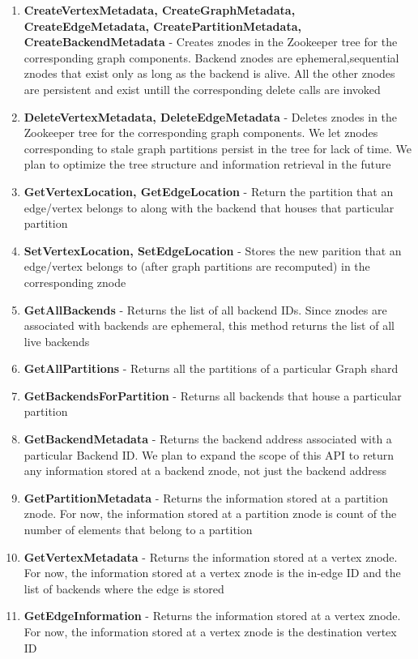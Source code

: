 \documentclass[letterpaper, 11 pt, conference]{ieeeconf}  %
\begin{document}
\begin{enumerate}
\item \textbf{CreateVertexMetadata, CreateGraphMetadata, CreateEdgeMetadata, CreatePartitionMetadata, CreateBackendMetadata} - Creates znodes in the Zookeeper tree for the corresponding graph components. Backend znodes are ephemeral,sequential znodes that exist only as long as the backend is alive. All the other znodes are persistent and exist untill the corresponding delete calls are invoked
\item \textbf{DeleteVertexMetadata, DeleteEdgeMetadata} - Deletes znodes in the Zookeeper tree for the corresponding graph components. We let znodes corresponding to stale graph partitions persist in the tree for lack of time. We plan to optimize the tree structure and information retrieval in the future
\item \textbf{GetVertexLocation, GetEdgeLocation} - Return the partition that an edge/vertex belongs to along with the backend that houses that particular partition 
\item \textbf{SetVertexLocation, SetEdgeLocation} - Stores the new parition that an edge/vertex belongs to (after graph partitions are recomputed) in the corresponding znode
\item \textbf{GetAllBackends} - Returns the list of all backend IDs. Since znodes are associated with backends are ephemeral, this method returns the list of all live backends
\item \textbf{GetAllPartitions} - Returns all the partitions of a particular Graph shard 
\item\textbf{GetBackendsForPartition} - Returns all backends that house a particular partition
\item\textbf{GetBackendMetadata} - Returns the backend address associated with a particular Backend ID. We plan to expand the scope of this API to return any information stored at a backend znode, not just the backend address
\item \textbf{GetPartitionMetadata} - Returns the information stored at a partition znode. For now, the information stored at a partition znode is count of the number of elements that belong to a partition
\item\textbf{GetVertexMetadata} - Returns the information stored at a vertex znode. For now, the information stored at a vertex znode is the in-edge ID and the list of backends where the edge is stored
\item\textbf{GetEdgeInformation} - Returns the information stored at a vertex znode. For now, the information stored at a vertex znode is the destination vertex ID

\end{enumerate}
\end{document}
